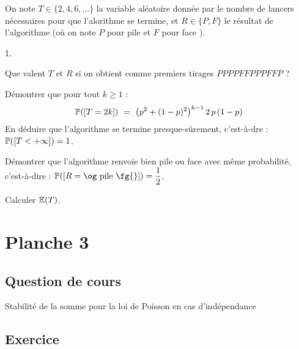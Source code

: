 \documentclass[11pt]{article}%
\begin{document}
\noindent
On note $T \in \{2,4,6, \ldots\}$ la variable aléatoire donnée par le 
nombre de lancers nécessaires pour que l'alorithme se termine, et $R\in 
\{P,F\}$ le résultat de l'algorithme (où on note $P$ pour \og pile 
\fg{} et $F$ pour \og face \fg{}).
\begin{noliste}{1.}
 \item Que valent $T$ et $R$ si on obtient comme premiers tirages 
 $PPPPFFPPPFFP$ ?
 
 \item Démontrer que pour tout $k \geq 1$ :
 \[
  \Prob(\Ev{T=2k}) \ = \ 
  \big(p^2 + (1-p)^2\big)^{k-1} \, 2 \, p \, (1-p)
 \]
 En déduire que l'algorithme se termine presque-sûrement, c'est-à-dre : 
 $\mathbb{P}(\left[ {T < +\infty} \right]) = 1$.
 
 \item Démontrer que l'algorithme renvoie bien \og pile \fg{} ou \og 
 face \fg{} avec même probabilité, c'est-à-dire : $\Prob(\Ev{R=
 \text{\og pile \fg{}}})=\dfrac{1}{2}$.
 
 \item Calculer $\mathbb{E}(T)$.
\end{noliste}




\newpage


\section*{Planche 3}
\subsection*{Question de cours}

\noindent
Stabilité de la somme pour la loi de Poisson en cas d'indépendance


\subsection*{Exercice} %
\end{document}
